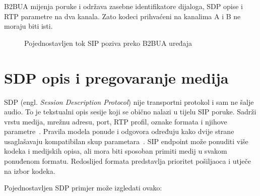 B2BUA mijenja poruke i održava zasebne identifikatore dijaloga, SDP opise i RTP parametre na dva kanala. Zato kodeci prihvaćeni na kanalima A i B ne moraju biti isti.

\begin{figure}[htbp]
\centering
{}
\caption{Pojednostavljen tok SIP poziva preko B2BUA uređaja}
\label{fig:sip-call-flow}
\end{figure}

\section{SDP opis i pregovaranje medija}

SDP (engl. \emph{Session Description Protocol}) nije transportni protokol i sam ne šalje audio. To je tekstualni opis sesije koji se obično nalazi u tijelu SIP poruke. Sadrži vrstu medija, mrežnu adresu, port, RTP profil, oznake formata i njihove parametre~\cite{rfc4566}. Pravila modela ponude i odgovora određuju kako dvije strane usaglašavaju kompatibilan skup parametara~\cite{rfc3264}. SIP endpoint može ponuditi više kodeka i medijskih opisa, ali mora biti sposoban primiti medij u svakom ponuđenom formatu. Redoslijed formata predstavlja prioritet pošiljaoca i utječe na izbor kodeka.

Pojednostavljen SDP primjer može izgledati ovako:

